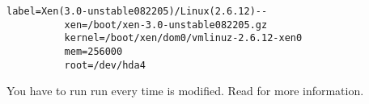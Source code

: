 \begin{verbatim}
label=Xen(3.0-unstable082205)/Linux(2.6.12)--
          xen=/boot/xen-3.0-unstable082205.gz
          kernel=/boot/xen/dom0/vmlinuz-2.6.12-xen0
          mem=256000
          root=/dev/hda4
\end{verbatim}

You have to run run  every time  is modified. Read  for more information.
